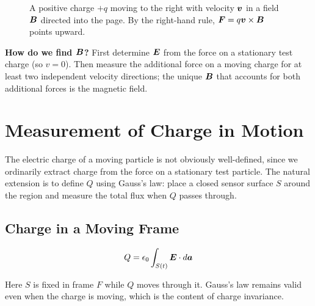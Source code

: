 \begin{figure}[H]
\begin{center}
\end{center}
\caption{A positive charge $+q$ moving to the right with velocity $\bm{v}$ in a field $\vect{B}$ directed into the page. By the right-hand rule, $\vect{F} = q\lvect{v}\times\vect{B}$ points upward.}
\end{figure}

\textbf{How do we find $\vect{B}$?} First determine $\vect{E}$ from the force on a stationary test charge (so $v=0$). Then measure the additional force on a moving charge for at least two independent velocity directions; the unique $\vect{B}$ that accounts for both additional forces is the magnetic field.

\section{Measurement of Charge in Motion}

The electric charge of a moving particle is not obviously well-defined, since we ordinarily extract charge from the force on a stationary test particle. The natural extension is to define $Q$ using Gauss's law: place a closed sensor surface $S$ around the region and measure the total flux when $Q$ passes through.

\subsection*{Charge in a Moving Frame}

\[
  Q = \epsilon_0 \int_{S(t)} \vect{E}\cdot d\lvect{a}
\]

Here $S$ is fixed in frame $F$ while $Q$ moves through it. Gauss's law remains valid even when the charge is moving, which is the content of charge invariance.


